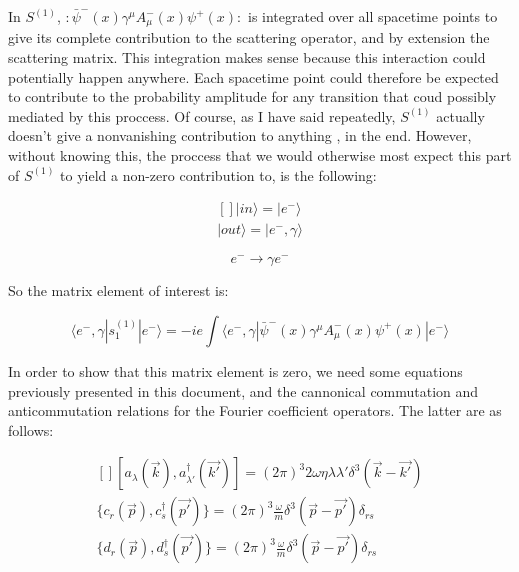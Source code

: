 \documentclass[a4]{article}
\begin{document}
\begin{framed}
\begin{center}
        \end{center}

        In $S^{(1)}$, $:\bar{\psi}^{-} (x) \gamma^{\mu} A_{\mu}^{-} (x) \psi^{+} (x):$ is integrated over all spacetime points to give its complete contribution to the scattering
        operator, and by extension the scattering matrix. This integration makes sense because this interaction could potentially happen anywhere. Each spacetime point could therefore
        be expected to contribute to the probability amplitude for any transition that coud possibly mediated by this proccess. Of course, as I have said repeatedly, $S^{(1)}$
        actually doesn't give a nonvanishing contribution to anything , in the end. However, without knowing this, the proccess that we would otherwise most expect this part of $S^{(1)}$
        to yield a non-zero contribution to, is the following:
        
        \begin{equation}
            \begin{aligned}[]
                | in \rangle = | e^{-} \rangle \\
                | out \rangle = | e^{-}, \gamma \rangle
            \end{aligned}
        \end{equation}

        \begin{equation}
            e^{-} \rightarrow \gamma e^{-}
        \end{equation}

        So the matrix element of interest is:

        \begin{equation}
            \langle e^{-}, \gamma | s_{1}^{(1)} | e^{-} \rangle = - i e \int \langle e^{-}, \gamma | \bar{\psi}^{-} (x) \gamma^{\mu} A_{\mu}^{-} (x) \psi^{+} (x) | e^{-} \rangle
        \end{equation}

        In order to show that this matrix element is zero, we need some equations previously presented in this document, and the cannonical commutation and anticommutation relations
        for the Fourier coefficient operators. The latter are as follows:

        \begin{equation}
            \begin{aligned}[]
                [a_{\lambda} (\vec{k}), a^{\dag}_{\lambda'} (\vec{k'}) ] = (2 \pi)^{3} 2 \omega \eta{\lambda \lambda'} \delta^{3} (\vec{k} - \vec{k'}) \\
                \{c_{r} (\vec{p}), c^{\dag}_{s} (\vec{p'}) \} = (2 \pi)^{3} \frac{\omega}{m} \delta^{3} (\vec{p} - \vec{p'}) \delta_{rs} \\
                \{d_{r} (\vec{p}), d^{\dag}_{s} (\vec{p'}) \} = (2 \pi)^{3} \frac{\omega}{m} \delta^{3} (\vec{p} - \vec{p'}) \delta_{rs}
            \end{aligned}
        \end{equation}


\end{framed}
\end{document}
